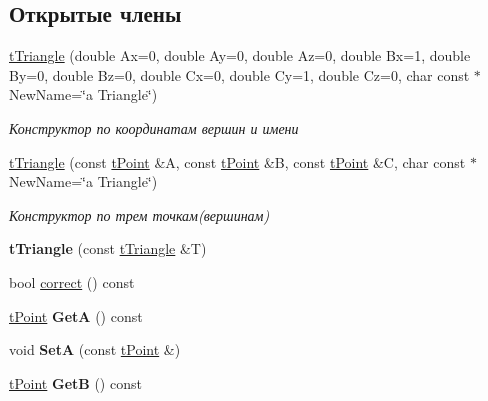 \subsection*{Открытые члены}
\begin{DoxyCompactItemize}
\item 
\mbox{\label{classtTriangle_a7d9deae65de86bc7dd8c4659921ab7e4}} 
\hyperlink{classtTriangle_a7d9deae65de86bc7dd8c4659921ab7e4}{t\+Triangle} (double Ax=0, double Ay=0, double Az=0, double Bx=1, double By=0, double Bz=0, double Cx=0, double Cy=1, double Cz=0, char const $\ast$New\+Name=\char`\"{}a Triangle\char`\"{})
\begin{DoxyCompactList}\small\item\em Конструктор по координатам вершин и имени \end{DoxyCompactList}\item 
\mbox{\label{classtTriangle_a083202f8a4ee5ad43997f7dfd02aa903}} 
\hyperlink{classtTriangle_a083202f8a4ee5ad43997f7dfd02aa903}{t\+Triangle} (const \hyperlink{classtPoint}{t\+Point} \&A, const \hyperlink{classtPoint}{t\+Point} \&B, const \hyperlink{classtPoint}{t\+Point} \&C, char const $\ast$New\+Name=\char`\"{}a Triangle\char`\"{})
\begin{DoxyCompactList}\small\item\em Конструктор по трем точкам(вершинам) \end{DoxyCompactList}\item 
\mbox{\label{classtTriangle_a64a9bc79b605a895405862df622b2508}} 
{\bfseries t\+Triangle} (const \hyperlink{classtTriangle}{t\+Triangle} \&T)
\item 
bool \hyperlink{classtTriangle_a21ecf9d970912497eca5009d6965aa54}{correct} () const
\item 
\mbox{\label{classtTriangle_a75c20d7c45085d9d3b510c4a457c1daa}} 
\hyperlink{classtPoint}{t\+Point} {\bfseries GetA} () const
\item 
\mbox{\label{classtTriangle_a2a6bbddf53b623165d2fba195287612b}} 
void {\bfseries SetA} (const \hyperlink{classtPoint}{t\+Point} \&)
\item 
\mbox{\label{classtTriangle_a243e7cc75b1a80d7a4901927d87c3161}} 
\hyperlink{classtPoint}{t\+Point} {\bfseries GetB} () const

\end{DoxyCompactItemize}
